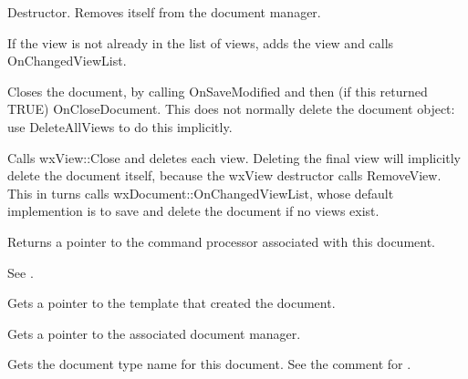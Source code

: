 

Destructor. Removes itself from the document manager.



If the view is not already in the list of views, adds the view and calls OnChangedViewList.



Closes the document, by calling OnSaveModified and then (if this returned TRUE) OnCloseDocument.
This does not normally delete the document object: use DeleteAllViews to do this implicitly.



Calls wxView::Close and deletes each view. Deleting the final view will implicitly
delete the document itself, because the wxView destructor calls RemoveView. This
in turns calls wxDocument::OnChangedViewList, whose default implemention is to
save and delete the document if no views exist.



Returns a pointer to the command processor associated with this document.

See .



Gets a pointer to the template that created the document.



Gets a pointer to the associated document manager.



Gets the document type name for this document. See the comment for .

